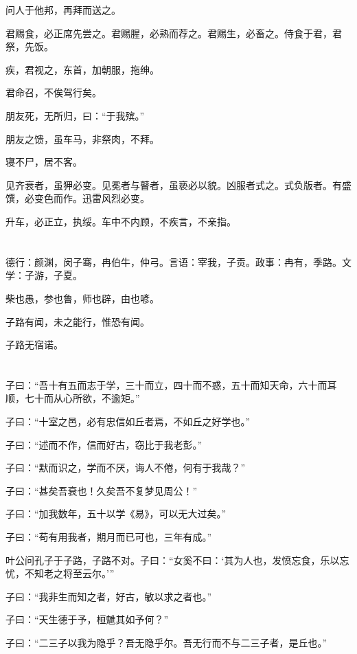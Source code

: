 \documentclass[a5paper]{ctexbook}
\begin{document}
    问人于他邦，再拜而送之。

    君赐食，必正席先尝之。君赐腥，必熟而荐之。君赐生，必畜之。侍食于君，君祭，先饭。

    疾，君视之，东首，加朝服，拖绅。
    
    君命召，不俟驾行矣。

    朋友死，无所归，曰：“于我殡。”
    
    朋友之馈，虽车马，非祭肉，不拜。
    
    寝不尸，居不客。

    见齐衰者，虽狎必变。见冕者与瞽者，虽亵必以貌。凶服者式之。式负版者。有盛馔，必变色而作。迅雷风烈必变。

    升车，必正立，执绥。车中不内顾，不疾言，不亲指。

    \chapter{}

    德行：颜渊，闵子骞，冉伯牛，仲弓。言语：宰我，子贡。政事：冉有，季路。文学：子游，子夏。

    柴也愚，参也鲁，师也辟，由也喭。

    子路有闻，未之能行，惟恐有闻。

    子路无宿诺。

    \chapter{}

    子曰：“吾十有五而志于学，三十而立，四十而不惑，五十而知天命，六十而耳顺，七十而从心所欲，不逾矩。”

    子曰：“十室之邑，必有忠信如丘者焉，不如丘之好学也。”

    子曰：“述而不作，信而好古，窃比于我老彭。”

    子曰：“默而识之，学而不厌，诲人不倦，何有于我哉？”

    子曰：“甚矣吾衰也！久矣吾不复梦见周公！”

    子曰：“加我数年，五十以学《易》，可以无大过矣。”

    子曰：“苟有用我者，期月而已可也，三年有成。”

    叶公问孔子于子路，子路不对。子曰：“女奚不曰：‘其为人也，发愤忘食，乐以忘忧，不知老之将至云尔。’”

    子曰：“我非生而知之者，好古，敏以求之者也。”

    子曰：“天生德于予，桓魋其如予何？”

    子曰：“二三子以我为隐乎？吾无隐乎尔。吾无行而不与二三子者，是丘也。”
\end{document}
